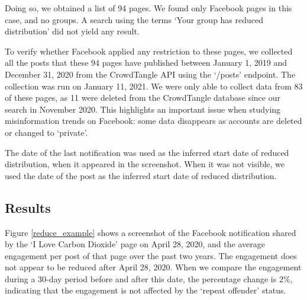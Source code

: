 \documentclass[11pt,a4paper]{article}
\begin{document}
Doing so, we obtained a list of 94 pages. 
We found only Facebook pages in this case, and no groups. 
A search using the terms `Your group has reduced distribution' did not yield any result.

To verify whether Facebook applied any restriction to these pages, we collected all the posts that these 94 pages have published between January 1, 2019 and December 31, 2020 from the CrowdTangle API using the `/posts' endpoint. 
The collection was run on January 11, 2021.
We were only able to collect data from 83 of these pages, as 11 were deleted from the CrowdTangle database since our search in November 2020. 
This highlights an important issue when studying misinformation trends on Facebook: some data disappears as accounts are deleted or changed to ‘private’.

The date of the last notification was used as the inferred start date of reduced distribution, when it appeared in the screenshot. 
When it was not visible, we used the date of the post as the inferred start date of reduced distribution. 

\subsection{Results}

Figure \ref{reduce_example} shows a screenshot of the Facebook notification shared by the ‘I Love Carbon Dioxide’ page on April 28, 2020, and the average engagement per post of that page over the past two years. 
The engagement does not appear to be reduced after April 28, 2020. 
When we compare the engagement during a 30-day period before and after this date, the percentage change is $2\%$, indicating that the engagement is not affected by the `repeat offender' status.
\end{document}
